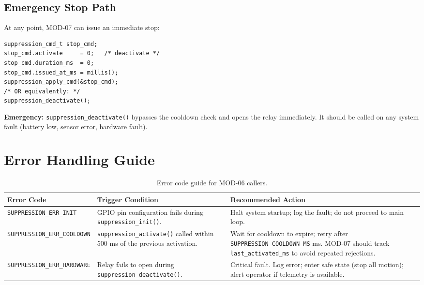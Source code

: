 \documentclass[12pt]{article}
\begin{document}
\subsection{Emergency Stop Path}

At any point, MOD-07 can issue an immediate stop:

\begin{lstlisting}[style=cstyle, numbers=none]
suppression_cmd_t stop_cmd;
stop_cmd.activate     = 0;   /* deactivate */
stop_cmd.duration_ms  = 0;
stop_cmd.issued_at_ms = millis();
suppression_apply_cmd(&stop_cmd);
/* OR equivalently: */
suppression_deactivate();
\end{lstlisting}

\begin{warnbox}
\textbf{Emergency:} \texttt{suppression\_deactivate()} bypasses the cooldown check and opens the relay immediately. It should be called on any system fault (battery low, sensor error, hardware fault).
\end{warnbox}

\section{Error Handling Guide}

\begin{table}[H]
\centering\small
\begin{tabularx}{\textwidth}{L{5.5cm} L{3.5cm} X}
\toprule
\textbf{Error Code} & \textbf{Trigger Condition} & \textbf{Recommended Action} \\
\midrule
\texttt{SUPPRESSION\_ERR\_INIT} & GPIO pin configuration fails during \texttt{suppression\_init()}. & Halt system startup; log the fault; do not proceed to main loop. \\[4pt]
\texttt{SUPPRESSION\_ERR\_COOLDOWN} & \texttt{suppression\_activate()} called within 500 ms of the previous activation. & Wait for cooldown to expire; retry after \texttt{SUPPRESSION\_COOLDOWN\_MS} ms. MOD-07 should track \texttt{last\_activated\_ms} to avoid repeated rejections. \\[4pt]
\texttt{SUPPRESSION\_ERR\_HARDWARE} & Relay fails to open during \texttt{suppression\_deactivate()}. & Critical fault. Log error; enter safe state (stop all motion); alert operator if telemetry is available. \\
\bottomrule
\end{tabularx}
\caption{Error code guide for MOD-06 callers.}
\end{table}
\end{document}
